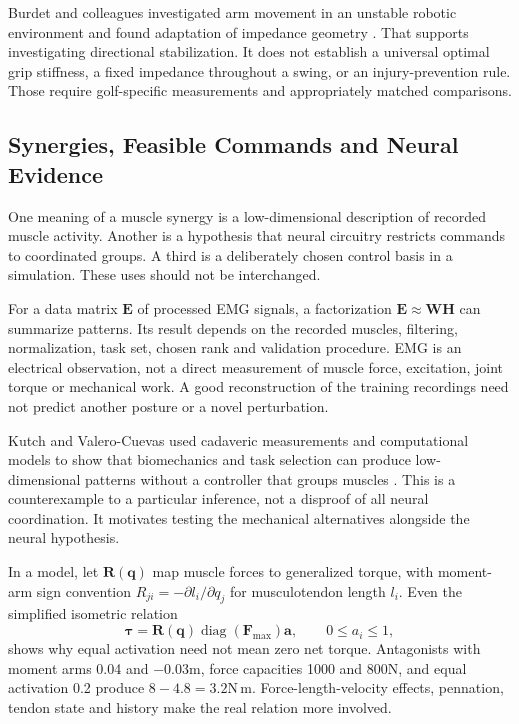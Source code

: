 Burdet and colleagues investigated arm movement in an unstable robotic environment and found adaptation of impedance geometry \citep{Burdet2001Impedance}. That supports investigating directional stabilization. It does not establish a universal optimal grip stiffness, a fixed impedance throughout a swing, or an injury-prevention rule. Those require golf-specific measurements and appropriately matched comparisons.

\subsection{Synergies, Feasible Commands and Neural Evidence}
\label{subsec:ch26_synergies}

One meaning of a muscle synergy is a low-dimensional description of recorded muscle activity. Another is a hypothesis that neural circuitry restricts commands to coordinated groups. A third is a deliberately chosen control basis in a simulation. These uses should not be interchanged.

For a data matrix $\bm E$ of processed EMG signals, a factorization $\bm E\approx\bm W\bm H$ can summarize patterns. Its result depends on the recorded muscles, filtering, normalization, task set, chosen rank and validation procedure. EMG is an electrical observation, not a direct measurement of muscle force, excitation, joint torque or mechanical work. A good reconstruction of the training recordings need not predict another posture or a novel perturbation.

Kutch and Valero-Cuevas used cadaveric measurements and computational models to show that biomechanics and task selection can produce low-dimensional patterns without a controller that groups muscles \citep{Kutch2012Synergies}. This is a counterexample to a particular inference, not a disproof of all neural coordination. It motivates testing the mechanical alternatives alongside the neural hypothesis.

In a model, let $\bm R(\bm q)$ map muscle forces to generalized torque, with moment-arm sign convention $R_{ji}=-\partial l_i/\partial q_j$ for musculotendon length $l_i$. Even the simplified isometric relation
\[
\bm\tau=\bm R(\bm q)\operatorname{diag}(\bm F_{\max})\bm a,
\qquad 0\leq a_i\leq1,
\]
shows why equal activation need not mean zero net torque. Antagonists with moment arms 0.04 and $-0.03$m, force capacities 1000 and 800N, and equal activation 0.2 produce $8-4.8=3.2$N\,m. Force-length-velocity effects, pennation, tendon state and history make the real relation more involved.

